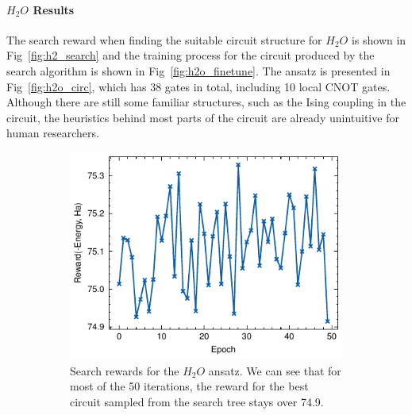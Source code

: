 \documentclass[a4paper,onecolumn,11pt]{quantumarticle}
\begin{document}
\paragraph{$H_2 O$ Results} The search reward when finding the suitable circuit structure for $H_2 O$ is shown in Fig~\ref{fig:h2_search} and the training process for the circuit produced by the search algorithm is shown in Fig~\ref{fig:h2o_finetune}. The ansatz is presented in Fig~\ref{fig:h2o_circ}, which has 38 gates in total, including 10 local CNOT gates. Although there are still some familiar structures, such as the Ising coupling in the circuit, the heuristics behind most parts of the circuit are already unintuitive for human researchers.
\begin{figure}[H]
    \centering
    \begin{subfigure}[t]{0.48\textwidth}
        \includegraphics[width=\textwidth]{Figures/fig_H2O_search_rewards.pdf}
        \caption{Search rewards for the $H_2 O$ ansatz. We can see that for most of the 50 iterations, the reward for the best circuit sampled from the search tree stays over 74.9.}
        \label{fig:h2o_search}
    \end{subfigure}
    ~ %
    \begin{subfigure}[t]{0.48\textwidth}

\end{subfigure}
\end{figure}
\end{document}
